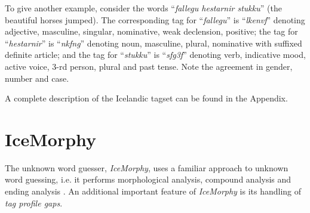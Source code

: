 \documentclass[11pt]{article}
\begin{document}
To give another example, consider the words ``\emph{fallegu hestarnir stukku}'' (the beautiful horses jumped).
The corresponding tag for ``\emph{fallegu}'' is ``\emph{lkenvf}'' denoting adjective, masculine, singular, nominative, weak declension, positive;
the tag for ``\emph{hestarnir}'' is ``\emph{nkfng}'' denoting noun, masculine, plural, nominative with suffixed definite article; and the tag for ``\emph{stukku}'' is ``\emph{sfg3f{\th}}'' denoting verb, indicative mood, active voice, 3-rd person, plural and past tense.
Note the agreement in gender, number and case.

A complete description of the Icelandic tagset can be found in the Appendix.

\section{IceMorphy}
\label{sec:iceMorphy}
The unknown word guesser, \emph{IceMorphy}, uses a familiar approach to unknown word guessing, i.e. it performs morphological analysis, compound analysis and ending analysis \citep{mik97,nak03}.
An additional important feature of \emph{IceMorphy} is its handling of \emph{tag profile gaps}.
\end{document}
